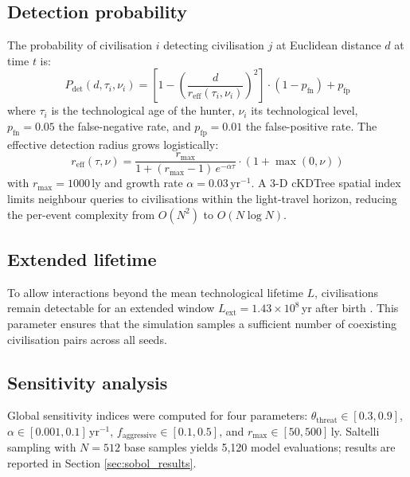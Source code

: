 \documentclass[useAMS,usenatbib]{mn2e}
\begin{document}
\subsection{Detection probability}
\label{sec:detection}

The probability of civilisation $i$ detecting civilisation $j$ at
Euclidean distance $d$ at time $t$ is:
\begin{equation}
  P_\text{det}(d, \tau_i, \nu_i) =
    \left[1 - \left(\frac{d}{r_\text{eff}(\tau_i, \nu_i)}\right)^2\right]
    \cdot (1 - p_\text{fn}) + p_\text{fp}
  \label{eq:pdet}
\end{equation}
where $\tau_i$ is the technological age of the hunter, $\nu_i$ its
technological level, $p_\text{fn} = 0.05$ the false-negative rate, and
$p_\text{fp} = 0.01$ the false-positive rate.
The effective detection radius grows logistically:
\begin{equation}
  r_\text{eff}(\tau, \nu) =
    \frac{r_\text{max}}{1 + (r_\text{max}-1)\,e^{-\alpha\tau}}
    \cdot (1 + \max(0,\nu))
  \label{eq:reff}
\end{equation}
with $r_\text{max} = 1000$\,ly \citep{troitskij1989,loeb2007} and
growth rate $\alpha = 0.03$\,yr$^{-1}$.
A 3-D cKDTree spatial index \citep{maneewongvatana1999} limits
neighbour queries to civilisations within the light-travel horizon,
reducing the per-event complexity from $O(N^2)$ to $O(N \log N)$.

\subsection{Extended lifetime}
\label{sec:lifetime}

To allow interactions beyond the mean technological lifetime $L$,
civilisations remain detectable for an extended window
$L_\text{ext} = 1.43\times10^8$\,yr after birth \citep{sandberg2018}.
This parameter ensures that the simulation samples a sufficient
number of coexisting civilisation pairs across all seeds.

\subsection{Sensitivity analysis}
\label{sec:sobol}

Global sensitivity indices \citep{saltelli2010} were computed for
four parameters: $\theta_\text{threat} \in [0.3,0.9]$,
$\alpha \in [0.001,0.1]$\,yr$^{-1}$, $f_\text{aggressive} \in [0.1,0.5]$,
and $r_\text{max} \in [50,500]$\,ly.
Saltelli sampling with $N = 512$ base samples yields 5{,}120 model
evaluations; results are reported in Section \ref{sec:sobol_results}.
\end{document}

